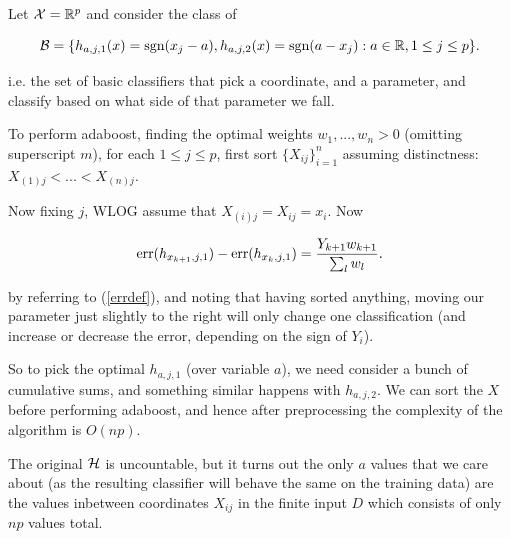 \documentclass[11pt]{scrartcl}
\begin{document}
\begin{example}

\label{decision stumps}

Let $\mathcal{X} = \mathbb R^p$ and consider the class of 

\begin{equation}
\mathcal{B} = \{ h_{a,j,1}(x) = \text{sgn}(x_j-a),  h_{a,j,2}(x) = \text{sgn}(a-x_j) : a \in \mathbb R, 1 \le j \le p \}.
\end{equation}

i.e. the set of basic classifiers that pick a coordinate, and a parameter, and classify based on what side of that parameter we fall.


To perform adaboost, finding the optimal weights $w_1, ... , w_n > 0$ (omitting superscript $m$), for each $1 \le j \le p$, first sort $\{ X_{ij} \}_{i=1}^n$ assuming distinctness: $X_{(1)j} < ... < X_{(n)j}$. %

Now fixing $j$, WLOG assume that $X_{(i)j} = X_{ij} = x_i$. Now 

\begin{equation}
    \text{err}(h_{x_{k+1}, j, 1}) - \text{err}(h_{x_{k}, j, 1}) = \frac{Y_{k+1}w_{k+1}}{\sum_l w_l}.
\end{equation}

by referring to (\ref{errdef}), and noting that having sorted anything, moving our parameter just slightly to the right will only change one classification (and increase or decrease the error, depending on the sign of $Y_i$).

So to pick the optimal $h_{a,j,1}$ (over variable $a$), we need consider a bunch of cumulative sums, and something similar happens with $h_{a,j,2}$. We can sort the $X$ before performing adaboost, and hence after preprocessing the complexity of the algorithm is $O(np)$.
\end{example}

\begin{remark}
The original $\mathcal{H}$ is uncountable, but it turns out the only $a$ values that we care about (as the resulting classifier will behave the same on the training data) are the values inbetween coordinates $X_{ij}$ in the finite input $D$ which consists of only $np$ values total.
\end{remark}
\end{document}

